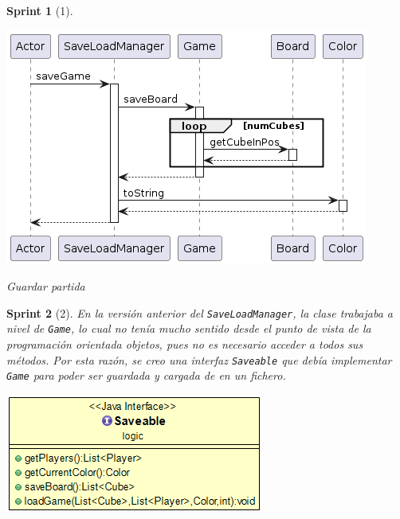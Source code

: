 \documentclass[12pt,a4paper,openright]{book}
\theoremstyle{break}
\newtheorem*{sprint}{Sprint}
\begin{document}
\begin{sprint}[1]
\begin{center}
\centering
\includegraphics[scale=0.5]{save-game-sprint1.png}

Guardar partida
\end{center}
\end{sprint}

\begin{sprint}[2]
En la versión anterior del \texttt{SaveLoadManager}, la clase trabajaba a nivel de \texttt{Game}, lo cual no tenía mucho sentido desde el punto de vista de la programación orientada objetos, pues no es necesario acceder a todos sus métodos. Por esta razón, se creo una interfaz \texttt{Saveable} que debía implementar \texttt{Game} para poder ser guardada y cargada de en un fichero.

\begin{center}
\centering
\includegraphics[scale=0.5]{saveable-sprint2.png}
\end{center}

\end{sprint}
\end{document}
